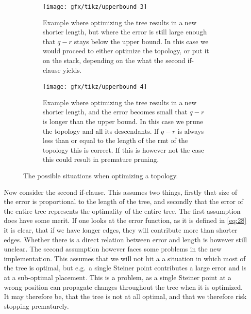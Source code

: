 \begin{figure}[htbp]
  \centering
  \begin{subfigure}[t]{0.4\textwidth}
    \texttt{[image: gfx/tikz/upperbound-3]}
    \caption{Example where optimizing the tree results in a new shorter length,
      but where the error is still large enough that $q-r$ stays below the upper
      bound. In this case we would proceed to either optimize the topology, or
      put it on the stack, depending on the what the second if-clause
      yields.\label{fig:upperbound-3}}
  \end{subfigure}\hspace{1em}
  \begin{subfigure}[t]{0.4\textwidth}
    \texttt{[image: gfx/tikz/upperbound-4]}
    \caption{Example where optimizing the tree results in a new shorter length,
      and the error becomes small that $q-r$ is longer than the upper bound. In
      this case we prune the topology and all its descendants. If $q-r$ is
      always less than or equal to the length of the \ac{rmt} of the topology
      this is correct. If this is however not the case this could result in
      premature pruning.\label{fig:upperbound-4}}
  \end{subfigure}
  \caption[Upper bounds, 3 and 4]{The possible situations when optimizing a
    topology.\label{fig:upperbound-3-4}}
\end{figure}

Now consider the second if-clause. This assumes two things, firstly that size of
the error is proportional to the length of the tree, and secondly that the error
of the entire tree represents the optimality of the entire tree. The first
assumption does have some merit. If one looks at the error function, as it is
defined in \cref{eq:28} it is clear, that if we have longer edges, they will
contribute more than shorter edges. Whether there is a direct relation between
error and length is however still unclear. The second assumption however faces
some problems in the new implementation. This assumes that we will not hit a
a situation in which most of the tree is optimal, but e.g.\ a single Steiner
point contributes a large error and is at a sub-optimal placement. This is a
problem, as a single Steiner point at a wrong position can propagate changes
throughout the tree when it is optimized. It may therefore be, that the tree is
not at all optimal, and that we therefore risk stopping prematurely.


